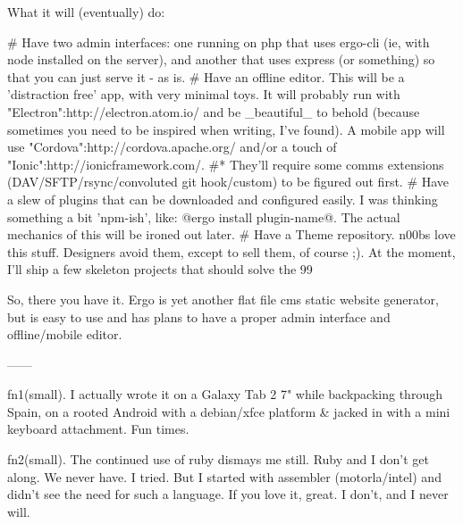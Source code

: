 What it will (eventually) do:

# Have two admin interfaces: one running on php that uses ergo-cli (ie, with node installed on the server), and another that uses express (or something) so that you can just serve it - as is.
# Have an offline editor. This will be a 'distraction free' app, with very minimal toys. It will probably run with "Electron":http://electron.atom.io/ and be _beautiful_ to behold (because sometimes you need to be inspired when writing, I've found). A mobile app will use "Cordova":http://cordova.apache.org/ and/or a touch of "Ionic":http://ionicframework.com/. 
#* They'll require some comms extensions (DAV/SFTP/rsync/convoluted git hook/custom) to be figured out first.
# Have a slew of plugins that can be downloaded and configured easily. I was thinking something a bit 'npm-ish', like: @ergo install plugin-name@. The actual mechanics of this will be ironed out later.
# Have a Theme repository. n00bs love this stuff. Designers avoid them, except to sell them, of course ;). At the moment, I'll ship a few skeleton projects that should solve the 99%


So, there you have it. Ergo is yet another flat file cms static website generator, but is easy to use and has plans to have a proper admin interface and offline/mobile editor.

------

fn1(small). I actually wrote it on a Galaxy Tab 2 7" while backpacking through Spain, on a rooted Android with a debian/xfce platform & jacked in with a mini keyboard attachment. Fun times.

fn2(small).  The continued use of ruby dismays me still. Ruby and I don't get along. We never have. I tried. But I started with assembler (motorla/intel) and didn't see the need for such a language. If you love it, great. I don't, and I never will.



